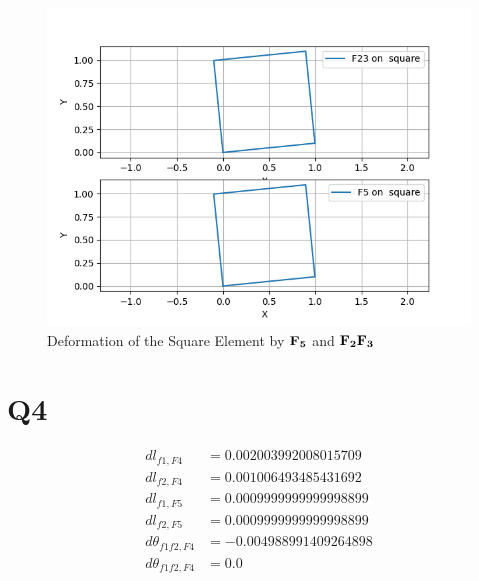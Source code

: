 \documentclass[a4paper,12pt]{article} %
\begin{document}
    \begin{figure}[htbp]
        \center
        \includegraphics[scale=0.6]{HW2Q3_2.png}
        \caption{Deformation of the Square Element by $\mathbf{F_5}$ and $\mathbf{F_2F_3}$}
    \end{figure}

\newpage
\section*{Q4}
\begin{align*}
dl_{f1,F4} &= 0.002003992008015709\\
dl_{f2,F4} &= 0.001006493485431692\\
dl_{f1,F5} &= 0.0009999999999998899\\
dl_{f2,F5} &= 0.0009999999999998899\\
d\theta_{f1f2,F4} &= -0.004988991409264898\\
d\theta_{f1f2,F4} &= 0.0  
\end{align*}
\end{document}
